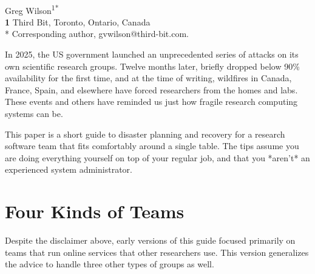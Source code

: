\documentclass[10pt,letterpaper]{article}
\begin{document}
\vspace*{0.2in}

\begin{flushleft}
{\Large
\textbf{}
}
\newline
\\
{Greg Wilson}\textsuperscript{1*}
\\
\bigskip
\textbf{1} Third Bit, Toronto, Ontario, Canada\\
* Corresponding author, gvwilson@third-bit.com.
\end{flushleft}

In 2025, the US government launched an unprecedented series of attacks on its
own scientific research groups.  Twelve months later, 
briefly dropped below 90\% availability for the first time, and at the time of
writing, wildfires in Canada, France, Spain, and elsewhere have forced
researchers from the homes and labs. These events and others have reminded us
just how fragile research computing systems can be.

This paper is a short guide to disaster planning and recovery for a research
software team that fits comfortably around a single table.  The tips assume you
are doing everything yourself on top of your regular job, and that you *aren't*
an experienced system administrator.

\section*{Four Kinds of Teams}

Despite the disclaimer above, early versions of this guide focused primarily on
teams that run online services that other researchers use.  This version
generalizes the advice to handle three other types of groups as well.
\end{document}
